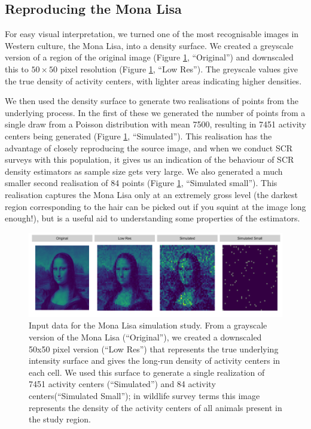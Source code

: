 \documentclass[10pt,a4paper]{article}
\begin{document}
\subsection{Reproducing the Mona Lisa} \label{monalisa}

For easy visual interpretation, we turned one of the most recognisable images in Western culture, the Mona Lisa, into a density surface. We created a greyscale version of a region of the original image (Figure \ref{mlinputs}, ``Original'') and downscaled this to $50\times 50$ pixel resolution (Figure \ref{mlinputs}, ``Low Res'').  The greyscale values give the true density of activity centers, with lighter areas indicating higher densities. 

We then used the density surface  to generate two realisations of points from the underlying process. In the first of these we generated the number of points from a single draw from a Poisson distribution with mean 7500, resulting in 7451 activity centers being generated (Figure \ref{mlinputs}, ``Simulated''). This realisation has the advantage of closely reproducing the source image, and when we conduct SCR surveys with this population, it gives us an indication of the behaviour of SCR density estimators as sample size gets very large. We also generated a much smaller second realisation of 84 points (Figure \ref{mlinputs}, ``Simulated small''). This realisation captures the Mona Lisa only at an extremely gross level (the darkest region corresponding to the hair can be picked out if you squint at the image long enough!), but is a useful aid to understanding some properties of the estimators.

\begin{figure}[htbp]
\centering
\includegraphics[width=1\textwidth]{mona_inputdata.png}
\caption{Input data for the Mona Lisa simulation study. From a grayscale version of the Mona Lisa (``Original''), we created a downscaled 50x50 pixel version (``Low Res'') that represents the true underlying intensity surface and gives the long-run density of activity centers in each cell. We used this surface to generate a single realization of 7451 activity centers (``Simulated'') and 84 activity centers(``Simulated Small''); in wildlife survey terms this image represents the density of the activity centers of all animals present in the study region.}
\label{mlinputs}
\end{figure}
\end{document}
